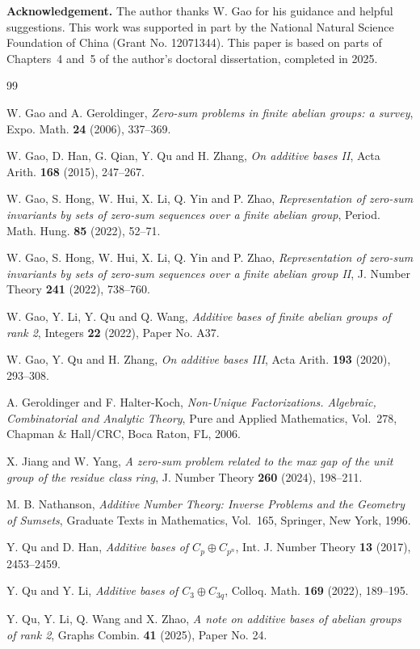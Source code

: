 \documentclass[10pt,reqno]{amsart}
\theoremstyle{definition}
\theoremstyle{remark}
\numberwithin{equation}{section}
\begin{document}
\bigskip
\noindent
{\bf Acknowledgement.}
The author thanks W. Gao for his guidance and helpful suggestions.
This work was supported in part by the National Natural Science Foundation
of China (Grant No. 12071344).
This paper is based on parts of Chapters~4 and~5 of the author's doctoral
dissertation, completed in 2025.


\begin{thebibliography}{99}

\bibitem{[GG2006]} W. Gao and A. Geroldinger,
\emph{Zero-sum problems in finite abelian groups: a survey},
Expo. Math. \textbf{24} (2006), 337--369.

\bibitem{[GHQQZ2015]} W. Gao, D. Han, G. Qian, Y. Qu and H. Zhang,
\emph{On additive bases II}, Acta Arith. \textbf{168} (2015), 247--267.

\bibitem{[GHHLYZ2022-1]} W. Gao, S. Hong, W. Hui, X. Li, Q. Yin and P. Zhao,
\emph{Representation of zero-sum invariants by sets of zero-sum
sequences over a finite abelian group},
Period. Math. Hung. \textbf{85} (2022), 52--71.

\bibitem{[GHHLYZ2022-2]} W. Gao, S. Hong, W. Hui, X. Li, Q. Yin and P. Zhao,
\emph{Representation of zero-sum invariants by sets of zero-sum
sequences over a finite abelian group II},
J. Number Theory \textbf{241} (2022), 738--760.

\bibitem{[GLQW2022]} W. Gao, Y. Li, Y. Qu and Q. Wang,
\emph{Additive bases of finite abelian groups of rank 2},
Integers \textbf{22} (2022), Paper No. A37.

\bibitem{[GQZ2020]} W. Gao, Y. Qu and H. Zhang,
\emph{On additive bases III}, Acta Arith. \textbf{193} (2020), 293--308.

\bibitem{[GH2006]} A. Geroldinger and F. Halter-Koch,
\emph{Non-Unique Factorizations. Algebraic, Combinatorial and Analytic Theory},
Pure and Applied Mathematics, Vol.~278, Chapman \& Hall/CRC,
Boca Raton, FL, 2006.

\bibitem{[JY2024]} X. Jiang and W. Yang,
\emph{A zero-sum problem related to the max gap of the unit group of the residue class ring},
J. Number Theory \textbf{260} (2024), 198--211.

\bibitem{[N1996]} M. B. Nathanson,
\emph{Additive Number Theory: Inverse Problems and the Geometry of Sumsets},
Graduate Texts in Mathematics, Vol.~165, Springer, New York, 1996.

\bibitem{[QH2017]} Y. Qu and D. Han,
\emph{Additive bases of $C_p\oplus C_{p^n}$},
Int. J. Number Theory \textbf{13} (2017), 2453--2459.

\bibitem{[QL2022]} Y. Qu and Y. Li,
\emph{Additive bases of $C_3\oplus C_{3q}$},
Colloq. Math. \textbf{169} (2022), 189--195.

\bibitem{[QLWZ2025]} Y. Qu, Y. Li, Q. Wang and X. Zhao,
\emph{A note on additive bases of abelian groups of rank 2},
Graphs Combin. \textbf{41} (2025), Paper No. 24.

\end{thebibliography}
\end{document}
